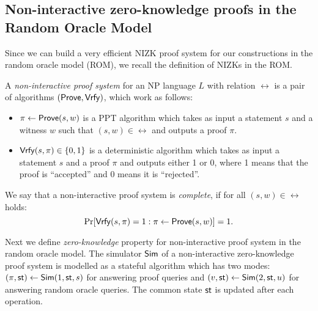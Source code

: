 \subsection{Non-interactive zero-knowledge proofs in the Random Oracle Model}
Since we can build a very efficient NIZK proof system for our constructions in the random oracle model (ROM), we recall the definition of NIZKs in the ROM.  

\begin{definition} 
A \emph{non-interactive proof system} for an NP language $L$ with relation $\rel$ is a pair of algorithms $(\mathsf{Prove}, \mathsf{Vrfy})$, which work as follows:
\begin{itemize}
\item $\pi \leftarrow \mathsf{Prove}(s,w)$ is a PPT algorithm which takes as input a statement $s$ and a witness $w$ such that $(s,w) \in \rel$ and outputs a proof $\pi$.
\item $\mathsf{Vrfy}(s, \pi) \in \{0,1\}$ is a deterministic algorithm which takes as input a statement $s$ and a proof $\pi$ and outputs either 1 or 0, where 1 means that the proof is ``accepted'' and 0 means it is ``rejected''.
\end{itemize}
We say that a non-interactive proof system is \emph{complete}, if for all $(s, w) \in \rel$ holds:
\[\Pr[\mathsf{Vrfy}(s,\pi)=1:\pi \leftarrow \mathsf{Prove}(s,w)] =1.\] 
\end{definition}

Next we define \emph{zero-knowledge} property for non-interactive proof system in the random oracle model. The simulator $\mathsf{Sim}$ of a non-interactive zero-knowledge proof system is modelled as a stateful algorithm which has two modes: $(\pi, \mathsf{st}) \leftarrow \mathsf{Sim}(1, \mathsf{st}, s)$  for answering proof queries and $(v, \mathsf{st}) \leftarrow \mathsf{Sim}(2, \mathsf{st}, u)$ for answering random oracle queries. The common state $\mathsf{st}$ is updated after each operation.



